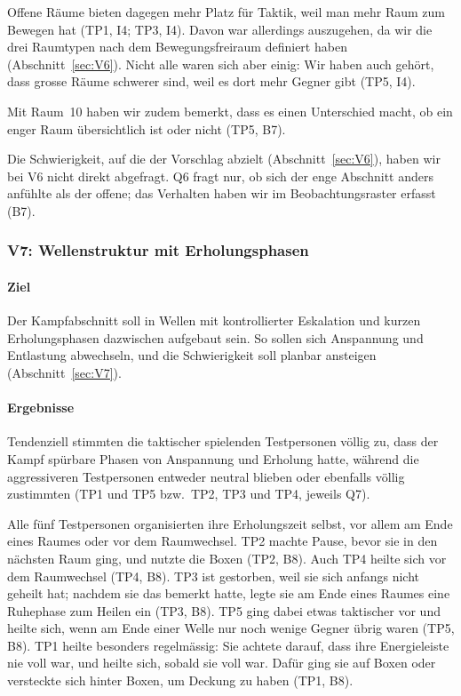 \documentclass[../Main.tex]{subfiles}
\begin{document}
Offene Räume bieten dagegen mehr Platz für Taktik, weil man mehr Raum zum Bewegen hat (TP1, I4; TP3, I4). Davon war allerdings auszugehen, da wir die drei Raumtypen nach dem Bewegungsfreiraum definiert haben (Abschnitt~\ref{sec:V6}). Nicht alle waren sich aber einig: Wir haben auch gehört, dass grosse Räume schwerer sind, weil es dort mehr Gegner gibt (TP5, I4).

Mit Raum~10 haben wir zudem bemerkt, dass es einen Unterschied macht, ob ein enger Raum übersichtlich ist oder nicht (TP5, B7).

Die Schwierigkeit, auf die der Vorschlag abzielt (Abschnitt~\ref{sec:V6}), haben wir bei V6 nicht direkt abgefragt. Q6 fragt nur, ob sich der enge Abschnitt anders anfühlte als der offene; das Verhalten haben wir im Beobachtungsraster erfasst (B7).

\subsubsection{V7: Wellenstruktur mit Erholungsphasen}

\paragraph{Ziel}
Der Kampfabschnitt soll in Wellen mit kontrollierter Eskalation und kurzen Erholungsphasen dazwischen aufgebaut sein. So sollen sich Anspannung und Entlastung abwechseln, und die Schwierigkeit soll planbar ansteigen (Abschnitt~\ref{sec:V7}).

\paragraph{Ergebnisse}
Tendenziell stimmten die taktischer spielenden Testpersonen völlig zu, dass der Kampf spürbare Phasen von Anspannung und Erholung hatte, während die aggressiveren Testpersonen entweder neutral blieben oder ebenfalls völlig zustimmten (TP1 und TP5 bzw.\ TP2, TP3 und TP4, jeweils Q7).

Alle fünf Testpersonen organisierten ihre Erholungszeit selbst, vor allem am Ende eines Raumes oder vor dem Raumwechsel. TP2 machte Pause, bevor sie in den nächsten Raum ging, und nutzte die Boxen (TP2, B8). Auch TP4 heilte sich vor dem Raumwechsel (TP4, B8). TP3 ist gestorben, weil sie sich anfangs nicht geheilt hat; nachdem sie das bemerkt hatte, legte sie am Ende eines Raumes eine Ruhephase zum Heilen ein (TP3, B8). TP5 ging dabei etwas taktischer vor und heilte sich, wenn am Ende einer Welle nur noch wenige Gegner übrig waren (TP5, B8). TP1 heilte besonders regelmässig: Sie achtete darauf, dass ihre Energieleiste nie voll war, und heilte sich, sobald sie voll war. Dafür ging sie auf Boxen oder versteckte sich hinter Boxen, um Deckung zu haben (TP1, B8).
\end{document}
